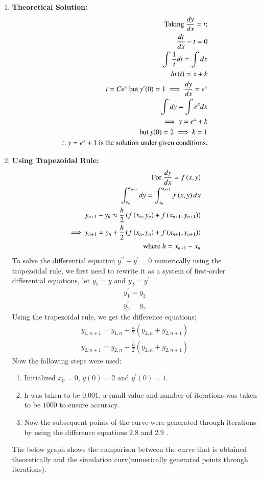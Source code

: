 \documentclass[journal]{IEEEtran}
\begin{document}
\begin{enumerate}
    \item \textbf{Theoretical Solution:}\\ 
    \begin{align}
        \text{Taking } \frac{dy}{dx}=t;\\
        \frac{dt}{dx}-t=0\\
        \int\frac{1}{t}dt=\int dx\\
        ln\left(t\right)=x+k\\
        t=Ce^x \text{ but } y^\prime(0)=1 \implies \frac{dy}{dx}=e^x\\
        \int dy=\int e^x dx\\
        \implies y = e^x+k\\
        \text{but } y(0)=2 \implies k=1\\
        \therefore y =e^x+1 \text{ is the solution under given conditions}.
    \end{align}
    \item \textbf{Using Trapezoidal Rule: }\\ 
    \begin{align}
        \text{For }\frac{dy}{dx}=f\left(x,y\right)\\
         \int_{y_n}^{y_{n+1}}dy=\int_{x_n}^{x_{n+1}}f\left(x,y\right)dx\\
         y_{n+1}-y_n\approx\frac{h}{2}\left(f\left(x_n,y_n\right)+f\left(x_{n+1},y_{n+1}\right)\right)\\
         \implies y_{n+1}=y_n+\frac{h}{2}\left(f\left(x_n,y_n\right)+f\left(x_{n+1},y_{n+1}\right)\right)\\
         \text{where } h=x_{n+1}-x_n
    \end{align}
    To solve the differential equation $y^{\prime \prime}-y^\prime=0$ numerically using the trapezoidal rule, we first need to rewrite it as a system of first-order differential equations, let $y_1=y \text{ and }y_2=y^\prime$
    \begin{align}
       y_1^\prime=y_2\\y_2^\prime=y_2
    \end{align}
    Using the trapezoidal rule, we get the difference equations;
    \begin{align}
        y_{1, n+1} = y_{1, n} + \frac{h}{2} \left( y_{2, n} + y_{2, n+1} \right)\\
        y_{2, n+1} = y_{2, n} + \frac{h}{2} \left( y_{2, n} + y_{2, n+1} \right)
    \end{align}
    Now the following steps were used:
    \begin{enumerate}
        \item Initialized $x_0=0$, $y(0)=2$ and $y^\prime(0)=1$.
        \item h was taken to be $0.001$, a small value and number of iterations was taken to be $1000$ to ensure accuracy.
        \item Now the subsequent points of the curve were generated through iterations by using the difference equations 2.8 and 2.9 .
    \end{enumerate}
    The below graph shows the comparison between the curve that is obtained theoretically and the simulation curv(numerically generated points through iterations).
\end{enumerate}
\end{document}
